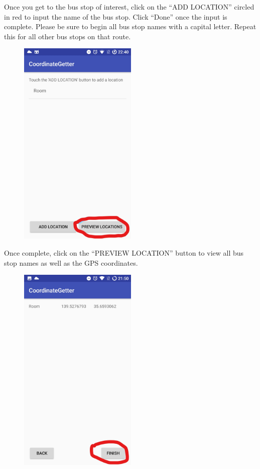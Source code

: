 \documentclass[fontsize=25pt]{scrbook}
\begin{document}
	Once you get to the bus stop of interest, click on the ``ADD LOCATION'' circled in red to input the name of the bus stop. Click ``Done'' once the input is complete. Please be sure to begin all bus stop names with a capital letter.
	Repeat this for all other bus stops on that route.
	\newpage
	\begin{center}
\begin{figure}
		\includegraphics[height=10cm]{Screenshot_15_LI.jpg}
		
		\end{figure}
	\end{center}
	Once complete, click on the ``PREVIEW LOCATION'' button to view all bus stop names as well as the GPS coordinates.
	\newpage
	\begin{center}
\begin{figure}
		\includegraphics[height=10cm]{Screenshot_16_LI.jpg}
		\
		\end{figure}
	\end{center}
\end{document}
